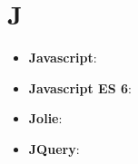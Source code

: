 \section{J}

\begin{itemize} 
	\item \textbf{Javascript}:
	\item \textbf{Javascript ES 6}:
	\item \textbf{Jolie}:
	\item \textbf{JQuery}: 
\end{itemize}